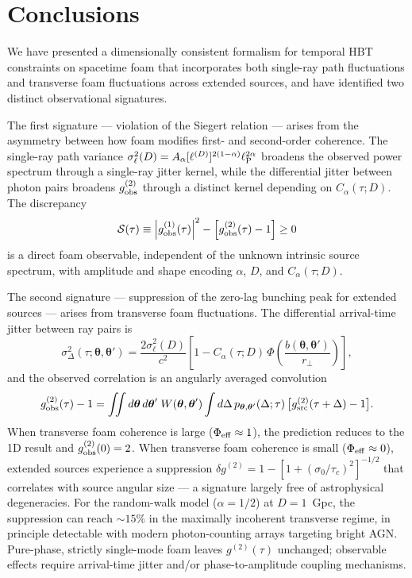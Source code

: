 \documentclass[aps,prd,onecolumn,amsmath,amssymb]{revtex4-2}
\begin{document}
\section{Conclusions}
\label{sec:conclusions}

We have presented a dimensionally consistent formalism for temporal HBT
constraints on spacetime foam that incorporates both single-ray path fluctuations
and transverse foam fluctuations across extended sources, and have identified
two distinct observational signatures.

The first signature — violation of the Siegert relation — arises from the
asymmetry between how foam modifies first- and second-order coherence.
The single-ray path variance $\sigma_\ell^2(D) =
A_\alpha[\ell^{(D)}]^{2(1-\alpha)}\ell_{\rm P}^{2\alpha}$ broadens the
observed power spectrum through a single-ray jitter kernel, while the
differential jitter between photon pairs broadens $g^{(2)}_{\rm obs}$ through
a distinct kernel depending on $C_\alpha(\tau;D)$.
The discrepancy
\[
  \mathcal{S}(\tau)
  \equiv \left|g^{(1)}_{\rm obs}(\tau)\right|^2
         - \left[g^{(2)}_{\rm obs}(\tau) - 1\right] \geq 0
\]
is a direct foam observable, independent of the unknown intrinsic source
spectrum, with amplitude and shape encoding $\alpha$, $D$, and
$C_\alpha(\tau;D)$.

The second signature — suppression of the zero-lag bunching peak for extended
sources — arises from transverse foam fluctuations.
The differential arrival-time jitter between ray pairs is
\[
  \sigma_{\Delta}^2(\tau;\boldsymbol{\theta},\boldsymbol{\theta}')
  = \frac{2\sigma_\ell^2(D)}{c^2}
    \left[1 - C_\alpha(\tau;D)\,
          \Phi\!\left(\frac{b(\boldsymbol{\theta},\boldsymbol{\theta}')}{r_\perp}
               \right)\right],
\]
and the observed correlation is an angularly averaged convolution
\[
  g^{(2)}_{\rm obs}(\tau) - 1
  = \iint d\boldsymbol{\theta}\,d\boldsymbol{\theta}'\;
    W(\boldsymbol{\theta},\boldsymbol{\theta}')
    \int d\Delta\,
    p_{\boldsymbol{\theta},\boldsymbol{\theta}'}(\Delta;\tau)\,
    \big[g^{(2)}_{\rm src}(\tau+\Delta) - 1\big].
\]
When transverse foam coherence is large ($\Phi_{\rm eff} \approx 1$), the
prediction reduces to the 1D result and $g^{(2)}_{\rm obs}(0) = 2$.
When transverse foam coherence is small ($\Phi_{\rm eff} \approx 0$), extended
sources experience a suppression $\delta g^{(2)} = 1 -
[1+(\sigma_0/\tau_c)^2]^{-1/2}$ that correlates with source angular size —
a signature largely free of astrophysical degeneracies.
For the random-walk model ($\alpha = 1/2$) at $D = 1$~Gpc, the suppression
can reach $\sim 15\%$ in the maximally incoherent transverse regime, in
principle detectable with modern photon-counting arrays targeting bright AGN.
Pure-phase, strictly single-mode foam leaves $g^{(2)}(\tau)$ unchanged;
observable effects require arrival-time jitter and/or phase-to-amplitude
coupling mechanisms.
\end{document}
